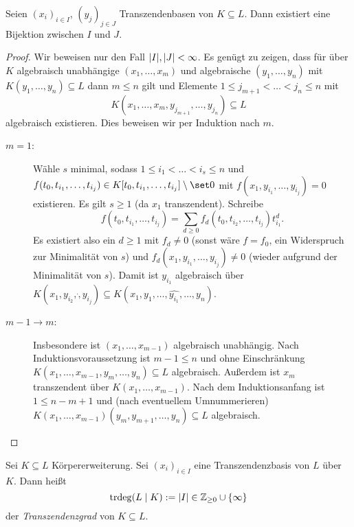 \documentclass[12pt,a4paper]{scrartcl}
\theoremstyle{cplain}
\theoremstyle{cdef}
\begin{document}
\begin{satz}
	Seien $(x_i)_{i\in I}$, $(y_j)_{j\in J}$ Transzendenbasen von $K\subseteq L$. Dann existiert eine Bijektion zwischen $I$ und $J$.
\end{satz}
\begin{proof}
	Wir beweisen nur den Fall $\lvert I\rvert, \lvert J\rvert <\infty$. Es genügt zu zeigen, dass für über $K$ algebraisch unabhängige $(x_1,\dots, x_m)$ und algebraische $(y_1,\dots, y_n)$ mit $K(y_1,\dots, y_n)\subseteq L$ dann $m\le n$ gilt und Elemente $1\le j_{m+1}<\dots < j_n\le n$ mit \[K(x_1,\dots, x_m, y_{j_{m+1}},\dots, y_{j_n})\subseteq L\] algebraisch existieren. Dies beweisen wir per Induktion nach $m$.
	\begin{description}
		\item[$m = 1$:] Wähle $s$ minimal, sodass $1\le i_1<\dots <i_s\le n$ und $f(t_0,t_{i_1}, \dots, t_{i_j})\in K[t_0, t_{i_1},\dots, t_{i_j}]\setminus \set 0$ mit $f(x_1, y_{i_1}, \dots, y_{i_j}) = 0$ existieren. Es gilt $s\ge 1$ (da $x_1$ transzendent). Schreibe
		\[f(t_0, t_{i_1},\dots, t_{i_j}) = \sum_{d\ge 0} f_d(t_0, t_{i_2}, \dots, t_{i_j})t_{i_1}^d.\]
		Es existiert also ein $d\ge 1$ mit $f_d \neq 0$ (sonst wäre $f = f_0$, ein Widerspruch zur Minimalität von $s$) und $f_d(x_1, y_{i_1},\dots, y_{i_j}) \neq 0$ (wieder aufgrund der Minimalität von $s$). Damit ist $y_{i_1}$ algebraisch über $K(x_1, y_{i_2},\dot, y_{i_j})\subseteq K(x_1,y_1,\dots, \hat{y_{i_1}},\dots, y_n)$.
		\item[$m-1\to m$:] Insbesondere ist $(x_1,\dots, x_{m-1})$ algebraisch unabhängig. Nach Induktionsvoraussetzung ist $m-1\le n$ und ohne Einschränkung $K(x_1,\dots, x_{m-1}, y_m,\dots, y_n)\subseteq L$ algebraisch. Außerdem ist $x_m$ transzendent über $K(x_1,\dots, x_{m-1})$. Nach dem Induktionsanfang ist $1\le n-m+1$ und (nach eventuellem Umnummerieren) $K(x_1,\dots, x_{m-1})(y_m, y_{m+1}, \dots , y_n)\subseteq L$ algebraisch.
		\qedhere
	\end{description}
\end{proof}
\begin{defi}
	Sei $K\subseteq L$ Körpererweiterung. Sei $(x_i)_{i\in I}$ eine Transzendenzbasis von $L$ über $K$. Dann heißt 
	\[\operatorname{trdeg}(L\mid K) := \lvert I\rvert\in\mathbb Z_{\ge 0}\cup \{\infty\}\]
	der \emph{Transzendenzgrad} von $K\subseteq L$.
\end{defi}
\end{document}
